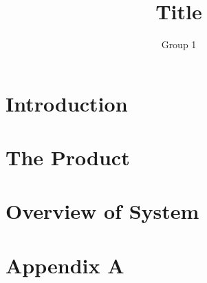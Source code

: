 \documentclass[12pt,a4paper]{article}
\begin{document}
\title{Title}
\author{Group 1}
 
\granskad{----}{\today}
\godkand{----}{\today}
\maketitle
\makestatus
\makeprojektidentitet
\makegruppmedlemmar
\makeprojektinfo
\makeinnehall

\section{Introduction}
\label{sec:Introduction}

\newpage
\section{The Product}
\label{sec:Product}

\newpage
\section{Overview of System}
\label{sec:Overview}

\newpage
\section*{Appendix A}
\label{sec:AppendixA}
\end{document}
